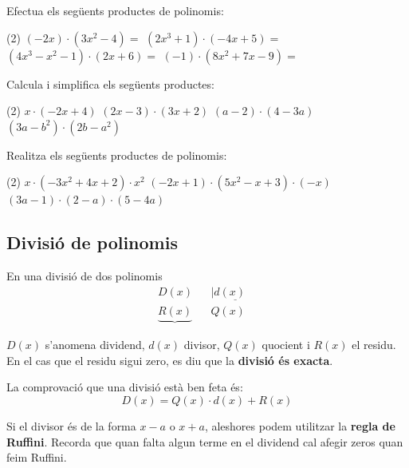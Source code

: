 \begin{mylist}
\answers{[$2(x^2+x+1)$, $x(x+1)$, $5x(3x+1)$, $-4(4x^2+x+2)$, $-5x(2x^2+3x-4)$, $6x^2(5x^2+6)$]}

\exer  Efectua els següents productes de polinomis:
\begin{tasks}(2)
	\task $(-2x)\cdot (3x^{2} -4)=$
	\task $(2x^{3} +1)\cdot (-4x+5)=$
	\task $(4x^{3} -x^{2} -1)\cdot (2x+6)=$
	\task $(-1)\cdot (8x^{2} +7x-9)=$
\end{tasks}  

 \answers{[$-6x^3+8x$, $-8x^4+10x^3-4x+5$, $8x^4+22x^3-6x^2-2x-6$, $-8x^2-7x+9$]}

\exer  Calcula i simplifica els següents productes: 

\begin{tasks}(2)
	\task   $x\cdot (-2x+4)$     
	\task   $(2x-3)\cdot (3x+2)$    
	\task   $(a-2)\cdot (4-3a)$  
	\task   $(3a-b^{2} )\cdot (2b-a^{2} )$ 
\end{tasks}

\answers{[$-2x^2+4x$, $6x^2-5x-6$, $-3a^2+10a-8$, $-3a^3 + a^2b^2+6ab-2b^3$]}


\exer[1]  Realitza els següents productes de polinomis:

\begin{tasks}(2)
	\task  $x\cdot (-3x^{2} +4x+2)\cdot x^{2} $  
	\task $(-2x+1)\cdot (5x^{2} -x+3)\cdot (-x)$  
	\task  $(3a-1)\cdot (2-a)\cdot (5-4a)$
\end{tasks}
\answers[cols=1]{[$-3x^5+4x^4+2x^3$, $10x^4-7x^3+7x^2-3x$, $12\,a^3-43\,a^2+43\,a-10$]}

\end{mylist}

\subsection{Divisió de polinomis}

\begin{theorybox}
	\begin{multicols}{2}
		\centering
	 \end{multicols}
En una divisió de dos polinomis
\[ 
	\begin{array}{lll}
	D(x) & & |\underline{d(x)\quad} \\
	\underbrace{R(x)} & & Q(x)
	\end{array}
\]

$D(x)$ s'anomena dividend, $d(x)$ divisor, $Q(x)$ quocient i $R(x)$ el residu. En el cas que el residu sigui zero, es diu que la \textbf{divisió és exacta}.

La comprovació que una divisió està ben feta és:
\[ \boxed{ D(x)= Q(x)\cdot d(x) + R(x)}  \]

Si el divisor és de la forma $x-a$ o $x+a$, aleshores podem utilitzar la \textbf{regla de Ruffini}. Recorda que quan falta algun terme en el dividend cal afegir zeros quan feim Ruffini.
   

   
\end{theorybox}

